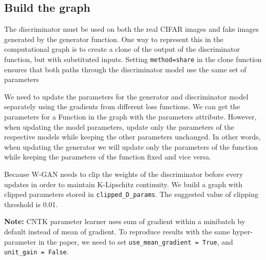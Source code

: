 \documentclass[]{book}
\theoremstyle{definition}
\theoremstyle{definition}
\theoremstyle{definition}
\theoremstyle{remark}
\begin{document}
\subsection{Build the graph}\label{build-the-graph}

The discriminator must be used on both the real CIFAR images and fake
images generated by the generator function. One way to represent this in
the computational graph is to create a clone of the output of the
discriminator function, but with substituted inputs. Setting
\texttt{method=share} in the clone function ensures that both paths
through the discriminator model use the same set of parameters

We need to update the parameters for the generator and discriminator
model separately using the gradients from different loss functions. We
can get the parameters for a Function in the graph with the parameters
attribute. However, when updating the model parameters, update only the
parameters of the respective models while keeping the other parameters
unchanged. In other words, when updating the generator we will update
only the parameters of the function while keeping the parameters of the
function fixed and vice versa.

Because W-GAN needs to clip the weights of the discriminator before
every updates in order to maintain K-Lipschitz continuity. We build a
graph with clipped parameters stored in \texttt{clipped\_D\_params}. The
suggested value of clipping threshold is 0.01.

\textbf{Note: } CNTK parameter learner uses sum of gradient within a
minibatch by default instead of mean of gradient. To reproduce results
with the same hyper-parameter in the paper, we need to set
\texttt{use\_mean\_gradient\ =\ True}, and
\texttt{unit\_gain\ =\ False}.
\end{document}
